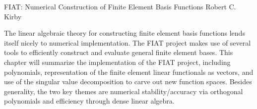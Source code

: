               {FIAT: Numerical Construction of Finite Element Basis Functions}
              {Robert C. Kirby}

\editornote{[kirby-2]}

The linear algebraic theory for constructing finite element basis
functions lends itself nicely to numerical implementation.  The FIAT
project makes use of several tools to efficiently construct and
evaluate general finite element bases.  This chapter will summarize
the implementation of the FIAT project, including polynomials,
representation of the finite element linear functionals as vectors,
and use of the singular value decomposition to carve out new function
spaces.  Besides generality, the two key themes are numerical
stability/accuracy via orthogonal polynomials and efficiency through
dense linear algebra.
